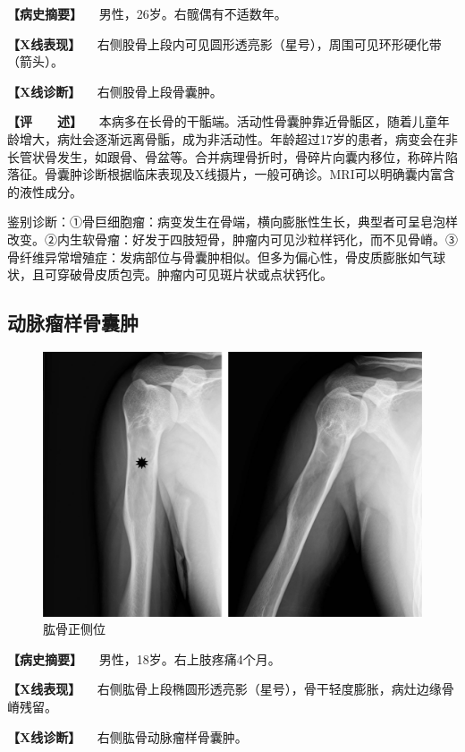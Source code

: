 \textbf{【病史摘要】} 　男性，26岁。右髋偶有不适数年。

\textbf{【X线表现】}
　右侧股骨上段内可见圆形透亮影（星号），周围可见环形硬化带（箭头）。

\textbf{【X线诊断】} 　右侧股骨上段骨囊肿。

\textbf{【评　　述】}
　本病多在长骨的干骺端。活动性骨囊肿靠近骨骺区，随着儿童年龄增大，病灶会逐渐远离骨骺，成为非活动性。年龄超过17岁的患者，病变会在非长管状骨发生，如跟骨、骨盆等。合并病理骨折时，骨碎片向囊内移位，称碎片陷落征。骨囊肿诊断根据临床表现及X线摄片，一般可确诊。MRI可以明确囊内富含的液性成分。

鉴别诊断：①骨巨细胞瘤：病变发生在骨端，横向膨胀性生长，典型者可呈皂泡样改变。②内生软骨瘤：好发于四肢短骨，肿瘤内可见沙粒样钙化，而不见骨嵴。③骨纤维异常增殖症：发病部位与骨囊肿相似。但多为偏心性，骨皮质膨胀如气球状，且可穿破骨皮质包壳。肿瘤内可见斑片状或点状钙化。

\subsection{动脉瘤样骨囊肿}

\begin{figure}[!htbp]
 \centering
 \includegraphics{./images/Image00110.jpg}
 \captionsetup{justification=centering}
 \caption{肱骨正侧位}
 \label{fig2-7-25}
  \end{figure} 

\textbf{【病史摘要】} 　男性，18岁。右上肢疼痛4个月。

\textbf{【X线表现】}
　右侧肱骨上段椭圆形透亮影（星号），骨干轻度膨胀，病灶边缘骨嵴残留。

\textbf{【X线诊断】} 　右侧肱骨动脉瘤样骨囊肿。

